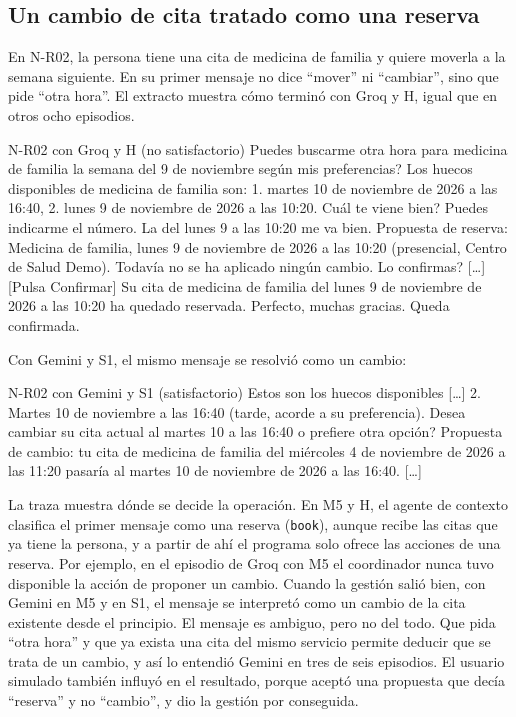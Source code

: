 \subsection{Un cambio de cita tratado como una reserva}
\label{sec:caso-otra-hora}

En N-R02, la persona tiene una cita de medicina de familia y quiere moverla a
la semana siguiente. En su primer mensaje no dice \enquote{mover} ni
\enquote{cambiar}, sino que pide \enquote{otra hora}. El extracto muestra cómo
terminó con Groq y H, igual que en otros ocho episodios.

\begin{extracto}{N-R02 con Groq y H (no satisfactorio)}
 \textquestiondown{}Puedes buscarme otra hora para medicina de familia la semana del 9 de noviembre según mis preferencias?
 Los huecos disponibles de medicina de familia son: 1. martes 10 de noviembre de 2026 a las 16:40, 2. lunes 9 de noviembre de 2026 a las 10:20. \textquestiondown{}Cuál te viene bien? Puedes indicarme el número.
 La del lunes 9 a las 10:20 me va bien.
 Propuesta de reserva: Medicina de familia, lunes 9 de noviembre de 2026 a las 10:20 (presencial, Centro de Salud Demo). Todavía no se ha aplicado ningún cambio. \textquestiondown{}Lo confirmas? [\ldots]
 [Pulsa Confirmar]
 Su cita de medicina de familia del lunes 9 de noviembre de 2026 a las 10:20 ha quedado reservada.
 Perfecto, muchas gracias. Queda confirmada.
\end{extracto}

Con Gemini y S1, el mismo mensaje se resolvió como un cambio:

\begin{extracto}{N-R02 con Gemini y S1 (satisfactorio)}
 Estos son los huecos disponibles [\ldots] 2. Martes 10 de noviembre a las 16:40 (tarde, acorde a su preferencia). \textquestiondown{}Desea cambiar su cita actual al martes 10 a las 16:40 o prefiere otra opción?
 Propuesta de cambio: tu cita de medicina de familia del miércoles 4 de noviembre de 2026 a las 11:20 pasaría al martes 10 de noviembre de 2026 a las 16:40. [\ldots]
\end{extracto}

La traza muestra dónde se decide la operación. En M5 y H, el agente de
contexto clasifica el primer mensaje como una reserva (\texttt{book}), aunque
recibe las citas que ya tiene la persona, y a partir de ahí el programa solo
ofrece las acciones de una reserva. Por ejemplo, en el episodio de Groq con M5
el coordinador nunca tuvo disponible la acción de proponer un cambio. Cuando la
gestión salió bien, con Gemini en M5 y en S1, el mensaje se interpretó como un
cambio de la cita existente desde el principio. El mensaje es ambiguo, pero no
del todo. Que pida \enquote{otra hora} y que ya exista una cita del mismo
servicio permite deducir que se trata de un cambio, y así lo entendió Gemini en
tres de seis episodios. El usuario simulado también influyó en el resultado,
porque aceptó una propuesta que decía \enquote{reserva} y no \enquote{cambio}, y
dio la gestión por conseguida.

